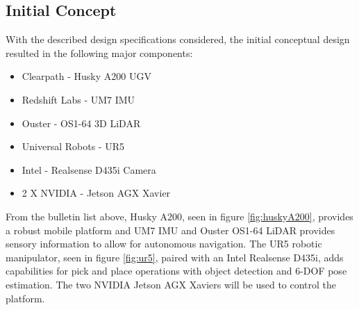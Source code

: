 \subsection{Initial Concept} \label{sec:M:CD:InitialConcept}
With the described design specifications considered, the initial conceptual design resulted in the following major components:

\begin{itemize}
    \item Clearpath - Husky A200 UGV
    \item Redshift Labs - UM7 IMU
    \item Ouster -  OS1-64 3D LiDAR
    \item Universal Robots - UR5
    \item Intel - Realsense D435i Camera
    \item 2 X NVIDIA - Jetson AGX Xavier
\end{itemize}

From the bulletin list above, Husky A200, seen in figure \ref{fig:huskyA200}, provides a robust mobile platform and UM7 IMU and Ouster OS1-64 LiDAR provides sensory information to allow for autonomous navigation. The UR5 robotic manipulator, seen in figure \ref{fig:ur5}, paired with an Intel Realsense D435i, adds capabilities for pick and place operations with object detection and 6-DOF pose estimation. The two NVIDIA Jetson AGX Xaviers will be used to control the platform.

